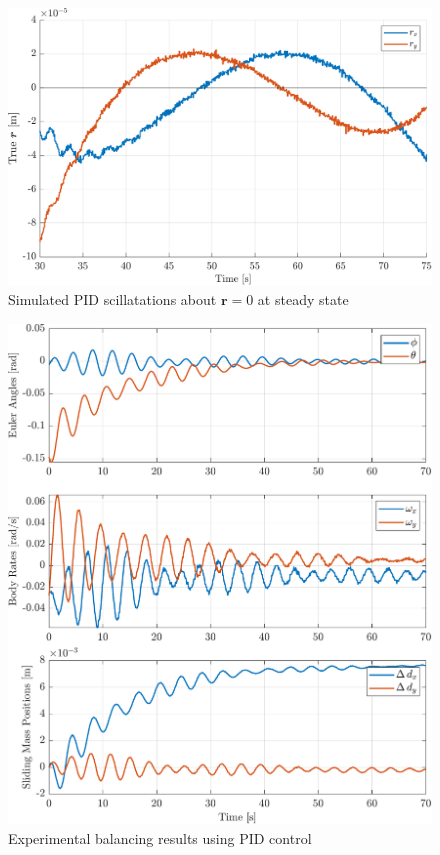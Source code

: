 \begin{figure}[ht]
    \centering
    \includegraphics[width=\linewidth]{plots/PID_sim_oscillations.pdf}
    \caption{Simulated PID scillatations about $\bm{r}=0$ at steady state}
\end{figure}



\begin{figure}[ht]
    \centering
    \includegraphics[width=\linewidth]{plots/PID_hardware_results.pdf}
    \caption{Experimental balancing results using PID control}
\end{figure}

